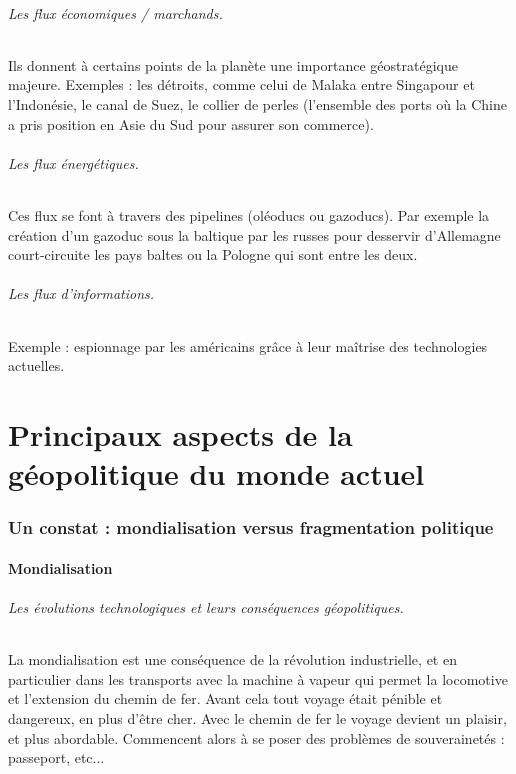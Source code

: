 \documentclass[a4paper,10pt]{article}
\begin{document}
		\paragraph{Les flux économiques / marchands.}

		Ils donnent à certains points de la planète une importance géostratégique majeure.
		Exemples : les détroits, comme celui de Malaka entre Singapour et l'Indonésie, le canal de Suez, le collier de perles (l'ensemble des ports où la Chine a pris position en Asie du Sud pour assurer son commerce).

		\paragraph{Les flux énergétiques.}

		Ces flux se font à travers des pipelines (oléoducs ou gazoducs).
		Par exemple la création d'un gazoduc sous la baltique par les russes pour desservir d'Allemagne court-circuite les pays baltes ou la Pologne qui sont entre les deux.

		\paragraph{Les flux d'informations.}

		Exemple : espionnage par les américains grâce à leur maîtrise des technologies actuelles.




\part{Principaux aspects de la géopolitique du monde actuel}

\section{Un constat : mondialisation versus fragmentation politique}

	\subsection{Mondialisation}

		\paragraph{Les évolutions technologiques et leurs conséquences géopolitiques.}

			La mondialisation est une conséquence de la révolution industrielle, et en particulier dans les transports avec la machine à vapeur qui permet la locomotive et l'extension du chemin de fer.
			Avant cela tout voyage était pénible et dangereux, en plus d'être cher.
			Avec le chemin de fer le voyage devient un plaisir, et plus abordable.
			Commencent alors à se poser des problèmes de souverainetés : passeport, etc...
\end{document}
